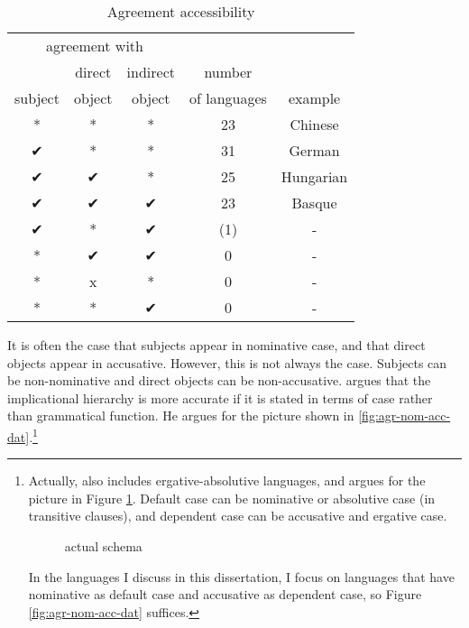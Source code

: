  \begin{table}[H]
   \center
   \caption {Agreement accessibility}
     \begin{tabular}[t]{ccccc}
       \toprule
           \multicolumn{3}{c}{agreement with} &              &         \\
       \cmidrule{1-3}
                    & direct & indirect       & number       &         \\
           subject  & object & object         & of languages & example \\
       \cmidrule{1-3} \cmidrule{4-4} \cmidrule{5-5}
           *    & * & * & 23  & Chinese    \\
           ✔    & * & * & 31  & German     \\
           ✔    & ✔ & * & 25  & Hungarian  \\
           ✔    & ✔ & ✔ & 23  & Basque     \\
           ✔    & * & ✔ & (1) & -          \\
           {*}  & ✔ & ✔ & 0   & -          \\
           {*}  & x & * & 0   & -          \\
           {*}  & * & ✔ & 0   & -          \\
       \bottomrule
     \end{tabular}
     \label{tbl:agr-typo}
 \end{table}

It is often the case that subjects appear in nominative case, and that direct objects appear in accusative. However, this is not always the case. Subjects can be non-nominative and direct objects can be non-accusative. \citet{bobaljik2006} argues that the implicational hierarchy is more accurate if it is stated in terms of case rather than grammatical function. He argues for the picture shown in \ref{fig:agr-nom-acc-dat}.\footnote{
Actually, \citet{bobaljik2006} also includes ergative-absolutive languages, and argues for the picture in Figure \ref{fig:agr-def-dep-dat}. Default case can be nominative or absolutive case (in transitive clauses), and dependent case can be accusative and ergative case.

\begin{figure}[H]
  \centering
  \caption{ actual schema}
  \label{fig:agr-def-dep-dat}
\end{figure}

In the languages I discuss in this dissertation, I focus on languages that have nominative as default case and accusative as dependent case, so Figure \ref{fig:agr-nom-acc-dat} suffices.}

